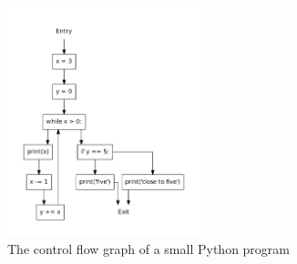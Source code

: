 \begin{figure}
  \center
  \includegraphics[width=0.5\textwidth]{figures/small_program.pdf}
  \caption{The control flow graph of a small Python program}
  \label{cfg_small_program}
\end{figure}
